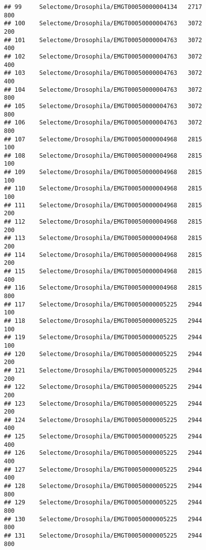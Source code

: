 \documentclass[
]{article}
\begin{document}
\begin{verbatim}
## 99     Selectome/Drosophila/EMGT00050000004134   2717                   800
## 100    Selectome/Drosophila/EMGT00050000004763   3072                   200
## 101    Selectome/Drosophila/EMGT00050000004763   3072                   400
## 102    Selectome/Drosophila/EMGT00050000004763   3072                   400
## 103    Selectome/Drosophila/EMGT00050000004763   3072                   400
## 104    Selectome/Drosophila/EMGT00050000004763   3072                   800
## 105    Selectome/Drosophila/EMGT00050000004763   3072                   800
## 106    Selectome/Drosophila/EMGT00050000004763   3072                   800
## 107    Selectome/Drosophila/EMGT00050000004968   2815                   100
## 108    Selectome/Drosophila/EMGT00050000004968   2815                   100
## 109    Selectome/Drosophila/EMGT00050000004968   2815                   100
## 110    Selectome/Drosophila/EMGT00050000004968   2815                   100
## 111    Selectome/Drosophila/EMGT00050000004968   2815                   200
## 112    Selectome/Drosophila/EMGT00050000004968   2815                   200
## 113    Selectome/Drosophila/EMGT00050000004968   2815                   200
## 114    Selectome/Drosophila/EMGT00050000004968   2815                   200
## 115    Selectome/Drosophila/EMGT00050000004968   2815                   400
## 116    Selectome/Drosophila/EMGT00050000004968   2815                   800
## 117    Selectome/Drosophila/EMGT00050000005225   2944                   100
## 118    Selectome/Drosophila/EMGT00050000005225   2944                   100
## 119    Selectome/Drosophila/EMGT00050000005225   2944                   100
## 120    Selectome/Drosophila/EMGT00050000005225   2944                   200
## 121    Selectome/Drosophila/EMGT00050000005225   2944                   200
## 122    Selectome/Drosophila/EMGT00050000005225   2944                   200
## 123    Selectome/Drosophila/EMGT00050000005225   2944                   200
## 124    Selectome/Drosophila/EMGT00050000005225   2944                   400
## 125    Selectome/Drosophila/EMGT00050000005225   2944                   400
## 126    Selectome/Drosophila/EMGT00050000005225   2944                   400
## 127    Selectome/Drosophila/EMGT00050000005225   2944                   400
## 128    Selectome/Drosophila/EMGT00050000005225   2944                   800
## 129    Selectome/Drosophila/EMGT00050000005225   2944                   800
## 130    Selectome/Drosophila/EMGT00050000005225   2944                   800
## 131    Selectome/Drosophila/EMGT00050000005225   2944                   800

\end{verbatim}
\end{document}
